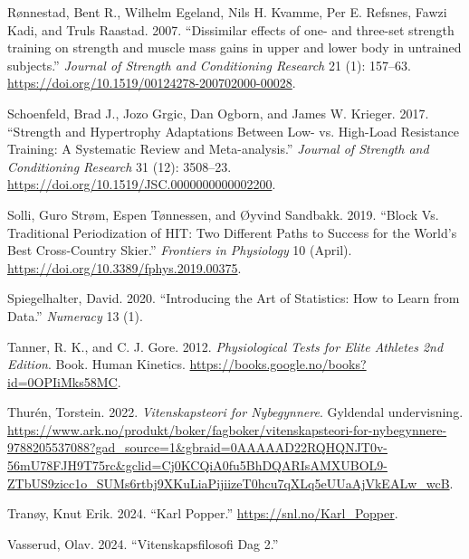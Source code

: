 \documentclass[
  letterpaper,
  DIV=11,
  numbers=noendperiod]{scrreprt}
\newlength{\cslhangindent}
\newenvironment{CSLReferences}[2] %
 {\begin{list}{}{%
  \setlength{\itemindent}{0pt}
  \setlength{\leftmargin}{0pt}
  \setlength{\parsep}{0pt}
  \ifodd #1
   \setlength{\leftmargin}{\cslhangindent}
   \setlength{\itemindent}{-1\cslhangindent}
  \fi
  \setlength{\itemsep}{#2\baselineskip}}}
 {\end{list}}
\begin{document}
\begin{CSLReferences}{1}{0}
Rønnestad, Bent R., Wilhelm Egeland, Nils H. Kvamme, Per E. Refsnes,
Fawzi Kadi, and Truls Raastad. 2007. {``Dissimilar effects of one- and
three-set strength training on strength and muscle mass gains in upper
and lower body in untrained subjects.''} \emph{Journal of Strength and
Conditioning Research} 21 (1): 157--63.
\url{https://doi.org/10.1519/00124278-200702000-00028}.

Schoenfeld, Brad J., Jozo Grgic, Dan Ogborn, and James W. Krieger. 2017.
{``Strength and Hypertrophy Adaptations Between Low- vs. High-Load
Resistance Training: A Systematic Review and Meta-analysis.''}
\emph{Journal of Strength and Conditioning Research} 31 (12): 3508--23.
\url{https://doi.org/10.1519/JSC.0000000000002200}.

Solli, Guro Strøm, Espen Tønnessen, and Øyvind Sandbakk. 2019. {``Block
Vs. Traditional Periodization of HIT: Two Different Paths to Success for
the World{'}s Best Cross-Country Skier.''} \emph{Frontiers in
Physiology} 10 (April). \url{https://doi.org/10.3389/fphys.2019.00375}.

Spiegelhalter, David. 2020. {``Introducing the Art of Statistics: How to
Learn from Data.''} \emph{Numeracy} 13 (1).

Tanner, R. K., and C. J. Gore. 2012. \emph{Physiological Tests for Elite
Athletes 2nd Edition}. Book. Human Kinetics.
\url{https://books.google.no/books?id=0OPIiMks58MC}.

Thurén, Torstein. 2022. \emph{Vitenskapsteori for Nybegynnere}.
Gyldendal undervisning.
\url{https://www.ark.no/produkt/boker/fagboker/vitenskapsteori-for-nybegynnere-9788205537088?gad_source=1&gbraid=0AAAAAD22RQHQNJT0v-56mU78FJH9T75rc&gclid=Cj0KCQiA0fu5BhDQARIsAMXUBOL9-ZTbUS9zicc1o_SUMs6rtbj9XKuLiaPijiizeT0hcu7qXLq5eUUaAjVkEALw_wcB}.

Tranøy, Knut Erik. 2024. {``Karl Popper.''}
\url{https://snl.no/Karl_Popper}.

Vasserud, Olav. 2024. {``Vitenskapsfilosofi Dag 2.''}

\end{CSLReferences}
\end{document}
